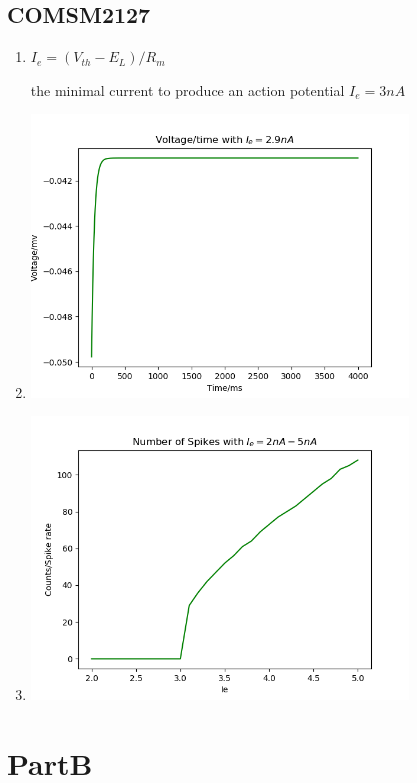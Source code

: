 \documentclass[fleqn,11pt]{article}
\begin{document}
\subsection*{COMSM2127}
\begin{enumerate}[1)]
\item  
  \par $I_e = (V_{th}-E_L)/R_m$
  \par the minimal current to produce an action potential  $I_e = 3nA$

\item
  \begin{center} 
    \includegraphics[width=10cm]{graphs/COMS2127_2.png}
  \end{center}

\item
  \begin{center} 
    \includegraphics[width=10cm]{graphs/COMS2127_3.png}
  \end{center}

\end{enumerate}

\newpage

\section*{PartB}
\end{document}
